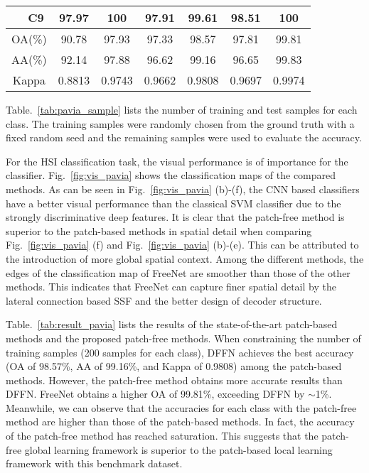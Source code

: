 \documentclass[journal]{IEEEtran}
\begin{document}
\begin{table}[hbt]
{\begin{tabular}{c|c|ccccc|c}
                                                    & C9                               & 97.97                          & 100       & 97.91  & 99.61   & 98.51                   & 100   \\ \hline
      \multicolumn{2}{c|}{OA(\%)}                   & 90.78                            & 97.93                          & 97.33     & 98.57 & 97.81 & 99.81                               \\
      \multicolumn{2}{c|}{AA(\%)}                   & 92.14                            & 97.88                          & 96.62     & 99.16 & 96.65 & 99.83                               \\
      \multicolumn{2}{c|}{Kappa}                    & 0.8813                           & 0.9743                         & 0.9662    & 0.9808&  0.9697 & 0.9974                              \\ \hline
    \end{tabular}
  }
\end{table}

Table.~\ref{tab:pavia_sample} lists the number of training and test samples for each class.
The training samples were randomly chosen from the ground truth with a fixed random seed and the remaining samples were used to evaluate the accuracy.


For the HSI classification task, the visual performance is of importance for the classifier.
Fig.~\ref{fig:vis_pavia} shows the classification maps of the compared methods.
As can be seen in Fig.~\ref{fig:vis_pavia} (b)-(f), the CNN based classifiers have a better visual performance than the classical SVM classifier due to the strongly discriminative deep features.
It is clear that the patch-free method is superior to the patch-based methods in spatial detail when comparing Fig.~\ref{fig:vis_pavia} (f) and Fig.~\ref{fig:vis_pavia} (b)-(e).
This can be attributed to the introduction of more global spatial context.
Among the different methods, the edges of the classification map of FreeNet are smoother than those of the other methods.
This indicates that FreeNet can capture finer spatial detail by the lateral connection based SSF and the better design of decoder structure.


Table.~\ref{tab:result_pavia} lists the results of the state-of-the-art patch-based methods and the proposed patch-free methods.
When constraining the number of training samples (200 samples for each class), DFFN achieves the best accuracy (OA of 98.57\%, AA of 99.16\%, and Kappa of 0.9808) among the patch-based methods.
However, the patch-free method obtains more accurate results than DFFN.
FreeNet obtains a higher OA of 99.81\%, exceeding DFFN by $\sim$1\%.
Meanwhile, we can observe that the accuracies for each class with the patch-free method are higher than those of the patch-based methods.
In fact, the accuracy of the patch-free method has reached saturation.
This suggests that the patch-free global learning framework is superior to the patch-based local learning framework with this benchmark dataset.
\end{document}
